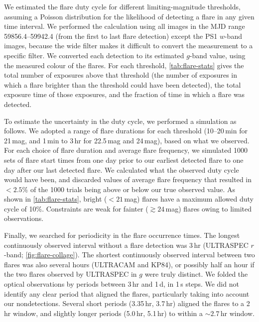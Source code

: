 \documentclass{nature_plusfigure}
\begin{document}
\begin{methods}
We estimated the flare duty cycle for different limiting-magnitude thresholds, assuming a Poisson distribution for the likelihood of detecting a flare in any given time interval.
We performed the calculation using all images in the MJD range 59856.4--59942.4 (from the first to last flare detection) except the PS1 $w$-band images, because the wide filter makes it difficult to convert the measurement to a specific filter.
We converted each detection to its estimated $g$-band value, using the measured colour of the flares.
For each threshold, \ref{tab:flare-stats} gives the total number of exposures above that threshold (the number of exposures in which a flare brighter than the threshold could have been detected), the total exposure time of those exposures, and the fraction of time in which a flare was detected. 

To estimate the uncertainty in the duty cycle, we performed a simulation as follows. We adopted a range of flare durations for each threshold (10--20\,min for 21\,mag, and 1\,min to 3\,hr for 22.5\,mag and 24\,mag), based on what we observed. For each choice of flare duration and average flare frequency, we simulated 1000 sets of flare start times from one day prior to our earliest detected flare to one day after our last detected flare. We calculated what the observed duty cycle would have been, and discarded values of average flare frequency that resulted in $<2.5\%$ of the 1000 trials being above or below our true observed value.  As shown in \ref{tab:flare-stats}, bright ($<21$\,mag) flares have a maximum allowed duty cycle of 10\%. Constraints are weak for fainter ($\gtrsim24$\,mag) flares owing to limited observations.%

Finally, we searched for periodicity in the flare occurrence times. The longest continuously observed interval without a flare detection was 3\,hr (ULTRASPEC $r$-band; \ref{fig:flare-collage}). The shortest continuously observed interval between two flares was also several hours (ULTRACAM and KP84), or possibly half an hour if the two flares observed by ULTRASPEC in $g$ were truly distinct. We folded the optical observations by periods between 3\,hr and 1\,d, in 1\,s steps.
We did not identify any clear period that aligned the flares, particularly taking into account our nondetections.
Several short periods (3.35\,hr, 3.7\,hr) aligned the flares to a 2\,hr window, and slightly longer periods (5.0\,hr, 5.1\,hr) to within a $\sim2.7$\,hr window.


\end{methods}
\end{document}
